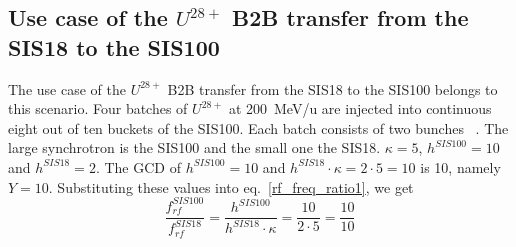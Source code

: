 
\subsection{Use case of the $U^{28+}$ B2B transfer from the SIS18 to the SIS100}
\label{sec:cir_no_int}
The use case of the $U^{28+}$ B2B transfer from the SIS18 to the SIS100 belongs to this scenario. Four batches of $U^{28+}$ at \SI{200}{MeV/\atomicmassunit} are injected into continuous eight out of ten buckets of the SIS100. Each batch consists of two bunches ~\cite{liebermann_fair_2013, liebermann_sis100_2013}. The large synchrotron is the SIS100 and the small one the SIS18. $\kappa=5$, $h^{\mathit{SIS100}}=10$ and $h^{\mathit{SIS18}}=2$. %
The GCD of $h^{\mathit{SIS100}}=10$ and $h^{\mathit{SIS18}} \cdot \kappa=2\cdot 5=10$ is 10, namely $Y=10$. Substituting these values into eq.~\ref{rf_freq_ratio1}, we get
\begin{equation}
\frac{f_{\mathit{rf}}^{\mathit{SIS100}}}{f_{\mathit{rf}}^{\mathit{SIS18}}}= \frac {h^{\mathit{SIS100}}}{h^{\mathit{SIS18}} \cdot \kappa}= \frac{10}{2 \cdot 5}=\frac{10}{10}
\end{equation}

